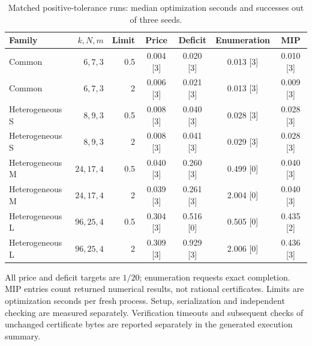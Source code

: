 \begin{table}[p]\centering\small
\caption{Matched positive-tolerance runs: median optimization seconds and successes out of three seeds.}\label{tab:primary56}
\begin{tabular}{@{}lrrcccc@{}}\toprule
Family & $k,N,m$ & Limit & Price & Deficit & Enumeration & MIP \\ \midrule
Common & $6,7,3$ & 0.5 & 0.004 [3] & 0.020 [3] & 0.013 [3] & 0.010 [3] \\
Common & $6,7,3$ & 2 & 0.006 [3] & 0.021 [3] & 0.013 [3] & 0.009 [3] \\
Heterogeneous S & $8,9,3$ & 0.5 & 0.008 [3] & 0.040 [3] & 0.028 [3] & 0.028 [3] \\
Heterogeneous S & $8,9,3$ & 2 & 0.008 [3] & 0.041 [3] & 0.029 [3] & 0.028 [3] \\
Heterogeneous M & $24,17,4$ & 0.5 & 0.040 [3] & 0.260 [3] & 0.499 [0] & 0.040 [3] \\
Heterogeneous M & $24,17,4$ & 2 & 0.039 [3] & 0.261 [3] & 2.004 [0] & 0.040 [3] \\
Heterogeneous L & $96,25,4$ & 0.5 & 0.304 [3] & 0.516 [0] & 0.505 [0] & 0.435 [2] \\
Heterogeneous L & $96,25,4$ & 2 & 0.309 [3] & 0.929 [3] & 2.006 [0] & 0.436 [3] \\
\bottomrule\end{tabular}
\par\smallskip\begin{minipage}{\textwidth}\footnotesize All price and deficit targets are $1/20$; enumeration requests exact completion. MIP entries count returned numerical results, not rational certificates. Limits are optimization seconds per fresh process. Setup, serialization and independent checking are measured separately. Verification timeouts and subsequent checks of unchanged certificate bytes are reported separately in the generated execution summary.\end{minipage}
\end{table}\clearpage
